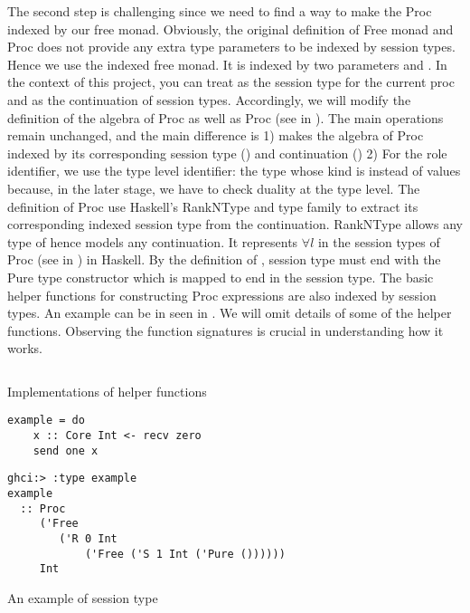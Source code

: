 The second step is challenging since we need to find a way to make the Proc indexed by our free monad. Obviously, the original definition of Free monad and Proc does not provide any extra type parameters to be indexed by session types. Hence we use the indexed free monad. It is indexed by two parameters  and . In the context of this project, you can treat  as the session type for the current proc and  as the continuation of session types. Accordingly, we will modify the definition of the algebra of Proc as well as Proc (see in ). The main operations remain unchanged, and the main difference is 1) makes the algebra of Proc indexed by its corresponding session type () and continuation () 2) For the role identifier, we use the type level identifier: the type whose kind is  instead of values because, in the later stage, we have to check duality at the type level. The definition of Proc use Haskell's RankNType and type family \hask{>*>} to extract its corresponding indexed session type  from the continuation. RankNType allows any type of  hence models any continuation. It represents $\forall l$ in the session types of Proc (see in ) in Haskell. By the definition of \hask{>*>}, session type  must end with the Pure type constructor which is mapped to end in the session type. The basic helper functions for constructing Proc expressions are also indexed by session types. An example can be in seen in . We will omit details of some of the helper functions. Observing the function signatures is crucial in understanding how it works.
\begin{listing}[ht]
    \inputminted{Haskell}{impl/typehelper.hs}
    \caption{Implementations of helper functions}
    \label{impl:code:typehelper}
\end{listing}

\begin{listing}[ht]
\begin{verbatim}
example = do
    x :: Core Int <- recv zero 
    send one x
\end{verbatim}
\begin{verbatim}
ghci:> :type example
example
  :: Proc
     ('Free
        ('R 0 Int
            ('Free ('S 1 Int ('Pure ())))))
     Int
\end{verbatim}
    \caption{An example of session type}
    \label{impl:code:typeexample}
\end{listing}

